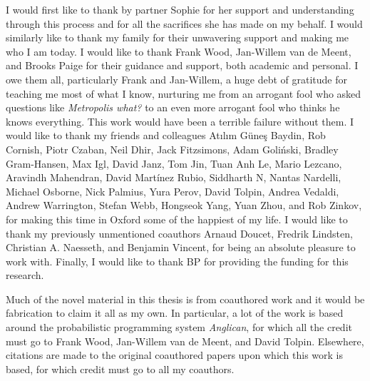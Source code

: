 
\vspace{20pt}
I would first like to thank by partner Sophie for her support and understanding through this
process and for all the sacrifices she has made on my behalf.  I would similarly like to
thank my family for their unwavering support and making me who I am today.  I would like
to thank Frank Wood, Jan-Willem van de Meent, and Brooks Paige for their guidance and
support, both academic and personal.  I owe them all, particularly Frank and Jan-Willem,
a huge debt of gratitude for teaching me most of what I know, nurturing me from an
arrogant fool who asked questions like \emph{Metropolis what?} to an even more arrogant
fool who thinks he knows everything.  This work would have been a terrible failure without them.
I would like to thank my friends and colleagues 
Atılım Güneş Baydin, Rob Cornish, Piotr Czaban, Neil Dhir, Jack Fitzsimons, Adam Goliński,
Bradley Gram-Hansen, Max Igl, David Janz, Tom Jin, Tuan Anh Le, Mario Lezcano, 
Aravindh Mahendran, David Martínez Rubio, Siddharth N, Nantas Nardelli, Michael Osborne,
Nick Palmius, Yura Perov, David Tolpin, Andrea Vedaldi, Andrew Warrington, Stefan Webb, 
Hongseok Yang, Yuan Zhou, and Rob Zinkov, for making this time in Oxford some of the 
happiest of my life.  I would like to thank my previously unmentioned coauthors Arnaud Doucet, Fredrik Lindsten,
Christian A. Naesseth, and Benjamin Vincent, for being an absolute pleasure to work with.
Finally, I would like to thank BP for providing the funding for this research.

Much of the novel material in this thesis is from coauthored work and it would be fabrication
to claim it all as my own.  In particular, a lot of the work is based around the probabilistic 
programming system \emph{Anglican}, for which all the credit must go to Frank Wood,
Jan-Willem van de Meent, and David Tolpin. Elsewhere, citations are made
to the original coauthored papers upon which this work is based, for which credit
must go to all my coauthors.